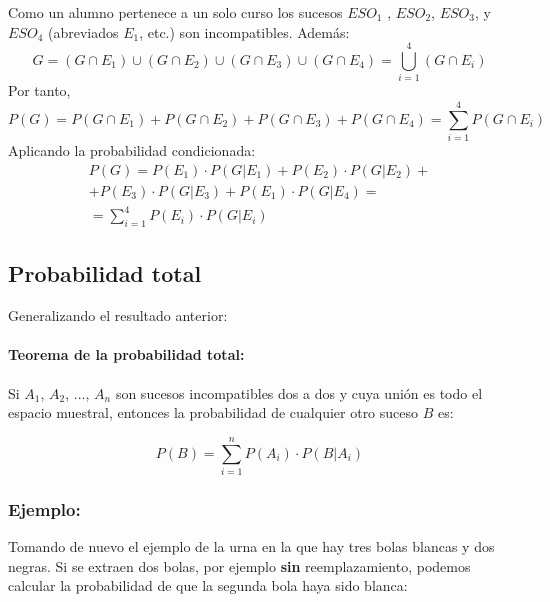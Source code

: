 
Como un alumno pertenece a un solo curso los sucesos $ESO_1$ , $ESO_2$, $ESO_3$, y $ESO_4$ (abreviados $E_1$, etc.) son incompatibles. Además: $$G=(G \cap E_1)\cup(G \cap E_2)\cup(G \cap E_3)\cup(G \cap E_4)=\bigcup_{i=1}^4(G \cap E_i)$$
Por tanto,
$$P(G)=P(G \cap E_1)+P(G \cap E_2)+P(G \cap E_3)+P(G \cap E_4)=\sum_{i=1}^4 P(G \cap E_i)$$
Aplicando la probabilidad condicionada:
\begin{eqnarray*}
P(G)=P(E_1)\cdot P(G|E_1)+P(E_2)\cdot P(G|E_2)+\\+P(E_3)\cdot P(G|E_3)+P(E_1)\cdot P(G|E_4)= \\ =\sum_{i=1}^4 P(E_i)\cdot  P(G|E_i)
\end{eqnarray*}

\subsection{Probabilidad total}
Generalizando el resultado anterior:

\paragraph{Teorema de la probabilidad total:} Si $A_1$, $A_2$, ..., $A_n$   son sucesos incompatibles dos a dos y cuya unión es todo el espacio muestral, entonces la probabilidad de cualquier otro suceso $B$ es:

$$P(B)=\sum_{i=1}^n P(A_i)\cdot  P(B|A_i) $$

\subsubsection{Ejemplo:} Tomando de nuevo el ejemplo de la urna en la que hay tres bolas blancas y dos negras. Si se extraen dos bolas, por ejemplo \textbf{sin} reemplazamiento, podemos calcular la probabilidad de que la segunda bola haya sido blanca: 

